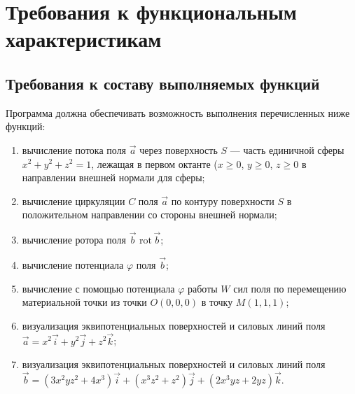 \documentclass[14pt,a4paper,final]{extreport}
\begin{document}
\section{Требования к функциональным характеристикам}

\subsection{Требования к составу выполняемых функций}
Программа должна обеспечивать возможность выполнения перечисленных ниже функций:
\begin{enumerate}[label=\asbuk*),ref=\asbuk*]
	\item вычисление потока поля \( \vec a \) через поверхность \( S \) --- часть единичной сферы \(x^2 + y^2 + z^2 = 1 \), лежащая в первом октанте (\( x \geq 0 \), \( y \geq 0 \), \( z \geq 0 \) в направлении внешней нормали для сферы;

	\item вычисление циркуляции \( C \) поля \( \vec a \) по контуру поверхности \( S \) в положительном направлении со стороны внешней нормали;

	\item вычисление ротора поля \( \vec b \) \( \mathrm{rot}\, \vec b \);

	\item вычисление потенциала \( \varphi \) поля \( \vec b \);

	\item вычисление с помощью потенциала \( \varphi \) работы \( W \) сил поля по перемещению материальной точки из точки \(O(0,0,0) \) в точку \( M(1,1,1) \);

	\item визуализация эквипотенциальных поверхностей и силовых линий поля \( \vec a = x^2 \vec i + y^2 \vec j + z^2 \vec k \);

	\item визуализация эквипотенциальных поверхностей и силовых линий поля \( \vec b = (3x^2yz^2+4x^3) \vec i + (x^3z^2+z^2) \vec j + (2x^3yz+2yz) \vec k \).
\end{enumerate}

\pagebreak %
\end{document}
